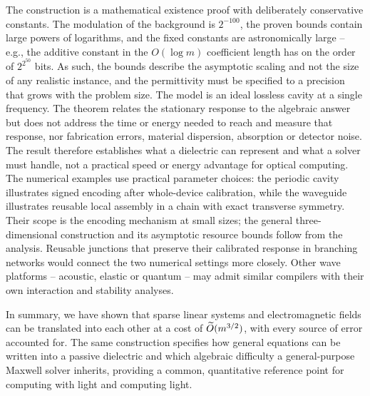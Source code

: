 The construction is a mathematical existence proof with deliberately
conservative constants. The modulation of the background is
$2^{-100}$, the proven bounds contain large powers of logarithms, and the fixed
constants are astronomically large -- e.g., the additive constant in the
$O(\log m)$ coefficient length has on the order of $2^{2^{50}}$ bits. As such,
the bounds describe the asymptotic scaling and not the size of any realistic
instance, and the permittivity must be specified to a precision that grows with
the problem size.
The model is an ideal lossless cavity at a single frequency. The theorem
relates the stationary response to the algebraic answer but does not address
the time or energy needed to reach and measure that response, nor fabrication
errors, material dispersion, absorption or detector noise. The result
therefore establishes what a dielectric can represent and what a solver must
handle, not a practical speed or energy advantage for optical computing.
The numerical examples use practical parameter choices: the periodic cavity
illustrates signed encoding after whole-device calibration, while the waveguide
illustrates reusable local assembly in a chain with exact transverse symmetry.
Their scope is the encoding mechanism at small sizes; the general
three-dimensional construction and its asymptotic resource bounds follow from
the analysis. Reusable junctions that preserve
their calibrated response in branching networks would connect the two numerical
settings more closely. Other wave platforms -- acoustic, elastic or quantum --
may admit similar compilers with their own interaction and stability analyses.

In summary, we have shown that sparse linear systems and electromagnetic
fields can be translated into each other at a cost of $\widetilde O(m^{3/2})$, with
every source of error accounted for. The same construction specifies how
general equations can be written into a passive dielectric and which
algebraic difficulty a general-purpose Maxwell solver inherits, providing a
common, quantitative reference point for computing with light and computing
light.
